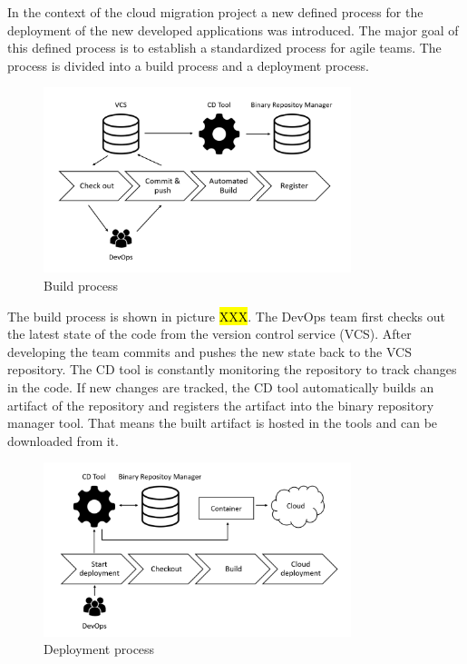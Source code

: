 In the context of the cloud migration project a new defined process for the deployment of the new developed applications was introduced. The major goal of this defined process is to establish a standardized process for agile teams. The process is divided into a build process and a deployment process.

\begin{figure}[htpb]
  \centering
  \includegraphics[width=0.8\textwidth]{figures/build-process.PNG}
  \caption{ Build process~\parencite{Corpancho Villasana 2018}}
  \label{fig:Build-process}
\end{figure}

The build process is shown in picture \hl{XXX}. The DevOps team first checks out the latest state of the code from the version control service (VCS). After developing the team commits and pushes the new state back to the VCS repository. The CD tool is constantly monitoring the repository to track changes in the code. If new changes are tracked, the CD tool automatically builds an artifact of the repository and registers the artifact into the binary repository manager tool. That means the built artifact is hosted in the tools and can be downloaded from it.

\begin{figure}[htpb]
  \centering
  \includegraphics[width=0.8\textwidth]{figures/deployment-process.PNG}
  \caption{ Deployment process~\parencite{Corpancho Villasana 2018}}
  \label{fig:Deployment-process}
\end{figure}

